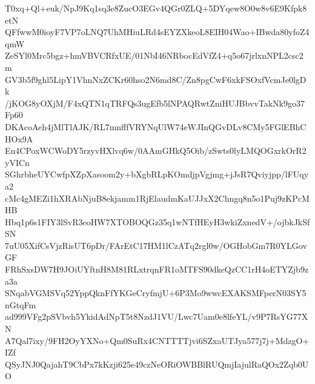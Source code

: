 T0xq+Ql+euk/NpJ9Kq1sq3e8ZucO3EGv4QGr0ZLQ+5DYqew8O0w8v6E9Kfpk8etN
QFfwwM0ioyF7VP7oLNQ7UhMHiuLRd4sEYZXkeoL8EIH04Wao+IBwda80yfoZ4qmW
ZeSYl0Mrc5bgz+hmVBVCRfxUE/01NbI46NRbocEdVfZ4+q5o67jrlxnNPL2csc2m
GV3b5f9ghl5LipY1VhnNxZCKr60hso2N6md8C/Zn8pgCwF6xkFSOxfVcmJe0lgDk
/jKOG8yOXjM/F4xQTN1qTRFQs3ugEfb5lNPAQRwtZniHUJBbvvTakNk9go37Fp60
DKAcoAeh4jMlTlAJK/RL7mnfffVRYNqUlW74eWJInQGvDLv8CMy5FGlEBhCHOx9A
Eu4CPoxWCWoDY5rzyvHXlvq6w/0AAmGHkQ5Oib/zSwts0lyLMQOGxrkOrR2yVICn
SGhrbheUYCwfpXZpXasoom2y+bXgbRLpKOmdjpVgjmg+jJsR7Qviyjpp/lFUqya2
cMc4gMEZi1hXRAbNjuB8ekjamm1RjElaudmKaUJJxX2Chngq8n5o1Puj9zKPcMHB
Hbq1p6s1FIY3lSvR3eoHW7XTOBOQGz35q1wNTfHEyH3wkiZxnedV+/ojbkJkSfSN
7uU05XifCsVjzRisUT6pDr/FArEtC17HM1lCzATq2rgl0w/OGHobGm7R0YLGovGF
FRhSxsDW7H9JOiUYftnH8M81RLxtrqnFR1oMTFS90dkeQzCC1rH4oETYZjb9za3a
SNqabVGMSVq52YppQknFfYKGeCryfmjU+6P3Mo9wwcEXAKSMFperN03SY5nGtqFm
ad999VFg2pSVbvh5YkidAdNpT5t8NzdJ1VU/Lwc7Uam0e8lfeYL/v9P7RsYG77XN
A7Qal7ixy/9FH2OyYXNo+Qm0SuRx4CNTTTTjvi6SZxaUTJya577j7j+MdzgO+IZf
QSyJNJ0QajahT9CbPx7kKzji625e49czNeORiOWBBlRUQmjIajulRaQOx2Zqb0UO

